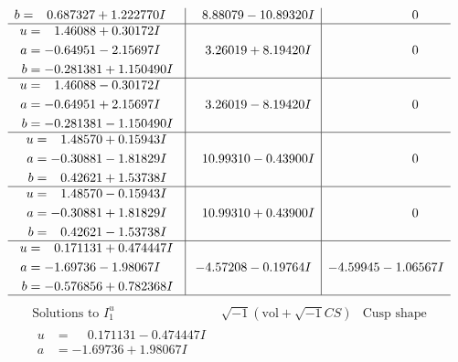 \documentclass[1p]{elsarticle_modified}
\theoremstyle{definition}
\newcommand{\I}{\sqrt{-1}}
\begin{document}
$$\begin{array}{c|c|c}
\begin{aligned}
b &= \phantom{-}0.687327 + 1.222770 I\end{aligned}
 & \phantom{-}8.88079 - 10.89320 I & \phantom{-0.000000 } 0 \\ \hline\begin{aligned}
u &= \phantom{-}1.46088 + 0.30172 I \\
a &= -0.64951 - 2.15697 I \\
b &= -0.281381 + 1.150490 I\end{aligned}
 & \phantom{-}3.26019 + 8.19420 I & \phantom{-0.000000 } 0 \\ \hline\begin{aligned}
u &= \phantom{-}1.46088 - 0.30172 I \\
a &= -0.64951 + 2.15697 I \\
b &= -0.281381 - 1.150490 I\end{aligned}
 & \phantom{-}3.26019 - 8.19420 I & \phantom{-0.000000 } 0 \\ \hline\begin{aligned}
u &= \phantom{-}1.48570 + 0.15943 I \\
a &= -0.30881 - 1.81829 I \\
b &= \phantom{-}0.42621 + 1.53738 I\end{aligned}
 & \phantom{-}10.99310 - 0.43900 I & \phantom{-0.000000 } 0 \\ \hline\begin{aligned}
u &= \phantom{-}1.48570 - 0.15943 I \\
a &= -0.30881 + 1.81829 I \\
b &= \phantom{-}0.42621 - 1.53738 I\end{aligned}
 & \phantom{-}10.99310 + 0.43900 I & \phantom{-0.000000 } 0 \\ \hline\begin{aligned}
u &= \phantom{-}0.171131 + 0.474447 I \\
a &= -1.69736 - 1.98067 I \\
b &= -0.576856 + 0.782368 I\end{aligned}
 & -4.57208 - 0.19764 I & -4.59945 - 1.06567 I\\
 \hline 
 \end{array}$$\newpage$$\begin{array}{c|c|c}  
\text{Solutions to }I^u_{1}& \I (\text{vol} + \sqrt{-1}CS) & \text{Cusp shape}\\
 \hline 
\begin{aligned}
u &= \phantom{-}0.171131 - 0.474447 I \\
a &= -1.69736 + 1.98067 I \\

\end{aligned}
\end{array}$$
\end{document}

